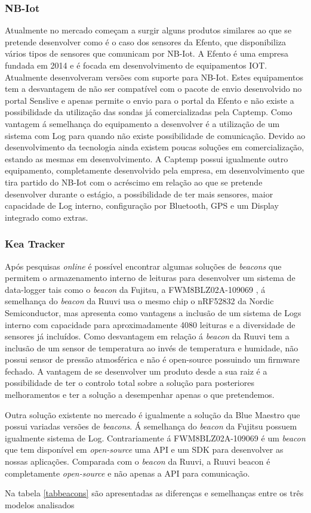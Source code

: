 \subsubsection{NB-Iot}
\par
Atualmente no mercado começam a surgir alguns produtos similares ao que se pretende desenvolver como é o caso dos sensores da Efento\cite{epoka}, que disponibiliza vários tipos de sensores que comunicam por NB-Iot. A Efento é uma empresa fundada em 2014 e é focada em desenvolvimento de equipamentos IOT. Atualmente desenvolveram versões com suporte para NB-Iot. Estes equipamentos tem a desvantagem de não ser compatível com o pacote de envio desenvolvido no portal Senslive e apenas permite o envio para o portal da Efento e não existe a possibilidade da utilização das sondas já comercializadas pela Captemp. Como vantagem á semelhança do equipamento a desenvolver é a utilização de um sistema com Log para quando não existe possibilidade de comunicação.
Devido ao desenvolvimento da tecnologia ainda existem poucas soluções em comercialização, estando as mesmas em desenvolvimento. A Captemp possui igualmente outro equipamento, completamente desenvolvido pela empresa, em desenvolvimento que tira partido do NB-Iot com o acréscimo em relação ao que se pretende desenvolver durante o estágio, a possibilidade de ter mais sensores, maior capacidade de Log interno, configuração por Bluetooth, GPS e um Display integrado como extras.


\subsubsection{Kea Tracker}
Após pesquisas \textit{online} é possível encontrar algumas soluções de \textit{beacons} que permitem o armazenamento interno de leituras para desenvolver um sistema de data-logger tais como o \textit{beacon} da Fujitsu, a FWM8BLZ02A-109069\cite{beacon1} , á semelhança do \textit{beacon} da Ruuvi usa o mesmo chip o nRF52832 da Nordic Semiconductor, mas apresenta como vantagens a inclusão de um sistema de Logs interno com capacidade para aproximadamente 4080 leituras e a diversidade de sensores já incluídos. Como desvantagem em relação á \textit{beacon} da Ruuvi tem a inclusão de um sensor de temperatura ao invés de temperatura e humidade, não possui sensor de pressão atmosférica e não é open-source possuindo um firmware fechado. A vantagem de se desenvolver um produto desde a sua raiz é a possibilidade de ter o controlo total sobre a solução para posteriores melhoramentos e ter a solução a desempenhar apenas o que pretendemos.
\par
Outra solução existente no mercado é igualmente a solução da Blue Maestro que possui variadas versões de \textit{beacons}. Á semelhança do \textit{beacon} da Fujitsu possuem igualmente sistema de Log. Contrariamente á FWM8BLZ02A-109069 é um \textit{beacon} que tem disponível em \textit{open-source} uma API e um SDK para desenvolver as nossas aplicações. Comparada com o \textit{beacon} da Ruuvi, a Ruuvi beacon é completamente \textit{open-source} e não apenas a API para comunicação.
\par
Na tabela \ref{tabbeacons} são apresentadas as diferenças e semelhanças entre os três modelos analisados

